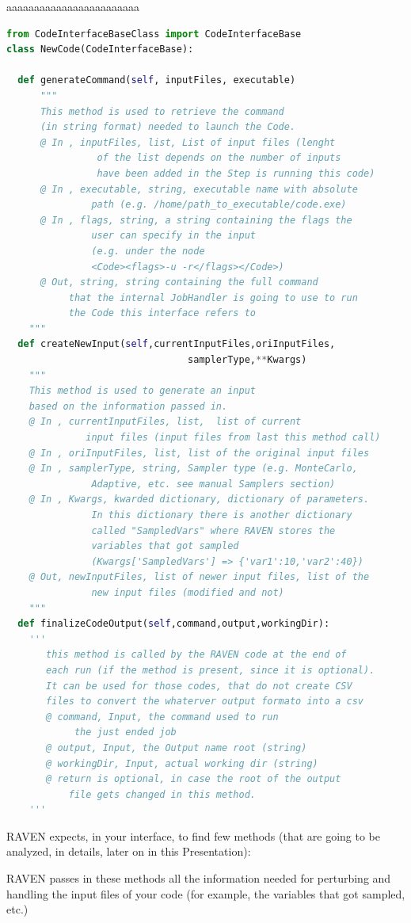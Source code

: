 aaaaaaaaaaaaaaaaaaaaaaaa
\begin{lstlisting}[language=python]
from CodeInterfaceBaseClass import CodeInterfaceBase
class NewCode(CodeInterfaceBase):

  def generateCommand(self, inputFiles, executable)
      """
      This method is used to retrieve the command 
      (in string format) needed to launch the Code.
      @ In , inputFiles, list, List of input files (lenght 
                of the list depends on the number of inputs 
                have been added in the Step is running this code)
      @ In , executable, string, executable name with absolute 
               path (e.g. /home/path_to_executable/code.exe)
      @ In , flags, string, a string containing the flags the 
               user can specify in the input 
               (e.g. under the node 
               <Code><flags>-u -r</flags></Code>)
      @ Out, string, string containing the full command 
           that the internal JobHandler is going to use to run
           the Code this interface refers to
    """
  def createNewInput(self,currentInputFiles,oriInputFiles,
                                samplerType,**Kwargs)
    """
    This method is used to generate an input 
    based on the information passed in.
    @ In , currentInputFiles, list,  list of current 
              input files (input files from last this method call)
    @ In , oriInputFiles, list, list of the original input files
    @ In , samplerType, string, Sampler type (e.g. MonteCarlo,
               Adaptive, etc. see manual Samplers section)
    @ In , Kwargs, kwarded dictionary, dictionary of parameters.
               In this dictionary there is another dictionary
               called "SampledVars" where RAVEN stores the 
               variables that got sampled 
               (Kwargs['SampledVars'] => {'var1':10,'var2':40})
    @ Out, newInputFiles, list of newer input files, list of the 
               new input files (modified and not)
    """                                
  def finalizeCodeOutput(self,command,output,workingDir):
    ''' 
       this method is called by the RAVEN code at the end of
       each run (if the method is present, since it is optional).
       It can be used for those codes, that do not create CSV 
       files to convert the whaterver output formato into a csv
       @ command, Input, the command used to run 
            the just ended job
       @ output, Input, the Output name root (string)
       @ workingDir, Input, actual working dir (string)
       @ return is optional, in case the root of the output 
           file gets changed in this method.
    '''
\end{lstlisting} 


RAVEN expects, in your interface, to find few methods (that are going to be analyzed, in details, later on in this Presentation):

RAVEN passes in these methods all  the information needed for perturbing and handling the input files of your code (for example, the variables that got sampled, etc.)

 